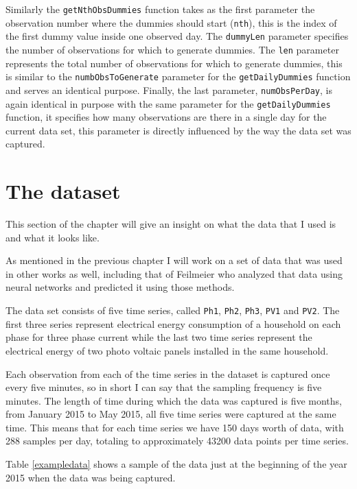 \documentclass[12pt,a4paper,titlepage]{report}
\begin{document}
Similarly the \texttt{getNthObsDummies} function takes as the first parameter the observation number where the dummies should start (\texttt{nth}), this is the index of the first dummy value inside one observed day. The \texttt{dummyLen} parameter specifies the number of observations for which to generate dummies. The \texttt{len} parameter represents the total number of observations for which to generate dummies, this is similar to the   \texttt{numbObsToGenerate} parameter for the \texttt{getDailyDummies} function and serves an identical purpose. Finally, the last parameter, \texttt{numObsPerDay}, is again identical in purpose with the same parameter for the \texttt{getDailyDummies} function, it specifies how many observations are there in a single day for the current data set, this parameter is directly influenced by the way the data set was captured.

\section{The dataset} \label{datasetsection}
This section of the chapter will give an insight on what the data that I used is and what it looks like.

As mentioned in the previous chapter I will work on a set of data that was used in other works as well, including that of Feilmeier \cite{feilmeier} who analyzed that data using neural networks and predicted it using those methods.

The data set consists of five time series, called \texttt{Ph1}, \texttt{Ph2}, \texttt{Ph3}, \texttt{PV1} and \texttt{PV2}.
The first three series represent electrical energy consumption of a household on each phase for three phase current while the last two time series represent the electrical energy of two photo voltaic panels installed in the same household.

Each observation from each of the time series in the dataset is captured once every five minutes, so in short I can say that the sampling frequency is five minutes.
The length of time during which the data was captured is five months, from January 2015 to May 2015, all five time series were captured at the same time. This means that for each time series we have 150 days worth of data, with 288 samples per day,  totaling to approximately 43200 data points per time series.

Table \ref{exampledata} shows a sample of the data just at the beginning of the year 2015 when the data was being captured.
\end{document}
